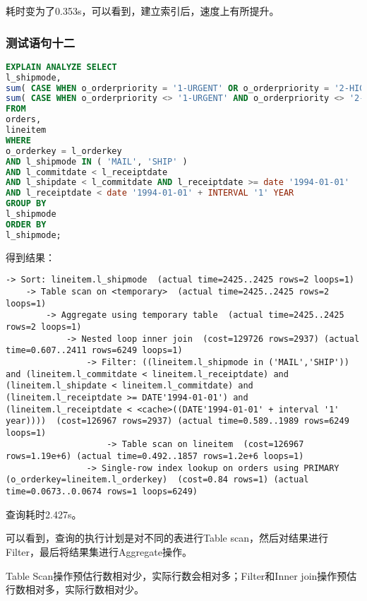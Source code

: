 \documentclass{article}
\begin{document}
耗时变为了0.353s，可以看到，建立索引后，速度上有所提升。

\subsubsection{测试语句十二}

\begin{lstlisting}[language=sql]
EXPLAIN ANALYZE SELECT
l_shipmode,
sum( CASE WHEN o_orderpriority = '1-URGENT' OR o_orderpriority = '2-HIGH' THEN 1 ELSE 0 END ) AS high_line_count,
sum( CASE WHEN o_orderpriority <> '1-URGENT' AND o_orderpriority <> '2-HIGH' THEN 1 ELSE 0 END ) AS low_line_count 
FROM
orders,
lineitem 
WHERE
o_orderkey = l_orderkey 
AND l_shipmode IN ( 'MAIL', 'SHIP' ) 
AND l_commitdate < l_receiptdate 
AND l_shipdate < l_commitdate AND l_receiptdate >= date '1994-01-01' 
AND l_receiptdate < date '1994-01-01' + INTERVAL '1' YEAR 
GROUP BY
l_shipmode 
ORDER BY
l_shipmode;
\end{lstlisting}

得到结果：

\begin{lstlisting}
-> Sort: lineitem.l_shipmode  (actual time=2425..2425 rows=2 loops=1)
    -> Table scan on <temporary>  (actual time=2425..2425 rows=2 loops=1)
        -> Aggregate using temporary table  (actual time=2425..2425 rows=2 loops=1)
            -> Nested loop inner join  (cost=129726 rows=2937) (actual time=0.607..2411 rows=6249 loops=1)
                -> Filter: ((lineitem.l_shipmode in ('MAIL','SHIP')) and (lineitem.l_commitdate < lineitem.l_receiptdate) and (lineitem.l_shipdate < lineitem.l_commitdate) and (lineitem.l_receiptdate >= DATE'1994-01-01') and (lineitem.l_receiptdate < <cache>((DATE'1994-01-01' + interval '1' year))))  (cost=126967 rows=2937) (actual time=0.589..1989 rows=6249 loops=1)
                    -> Table scan on lineitem  (cost=126967 rows=1.19e+6) (actual time=0.492..1857 rows=1.2e+6 loops=1)
                -> Single-row index lookup on orders using PRIMARY (o_orderkey=lineitem.l_orderkey)  (cost=0.84 rows=1) (actual time=0.0673..0.0674 rows=1 loops=6249)
\end{lstlisting}

查询耗时2.427s。

可以看到，查询的执行计划是对不同的表进行Table scan，然后对结果进行Filter，最后将结果集进行Aggregate操作。

Table Scan操作预估行数相对少，实际行数会相对多；Filter和Inner join操作预估行数相对多，实际行数相对少。
\end{document}
